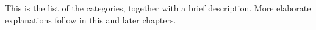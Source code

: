 \documentclass{book}
\begin{document}
This is the list of the categories, together with a brief
description. More elaborate explanations follow in this and
later chapters.
\end{document}
